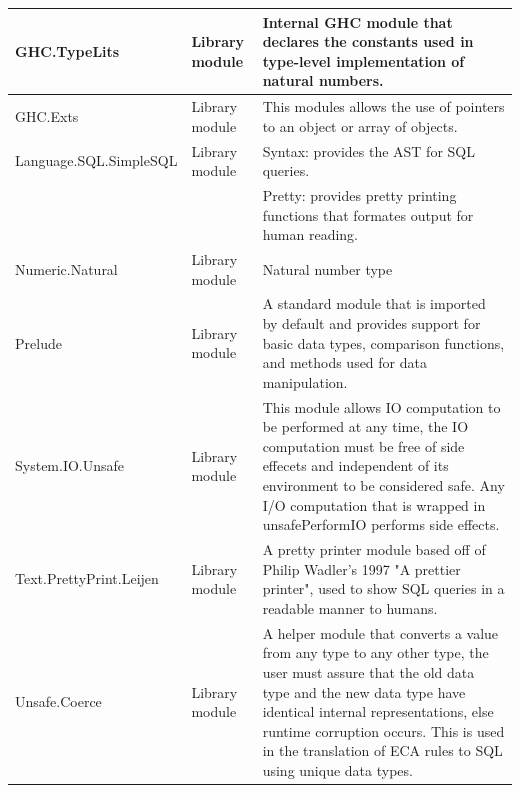 \documentclass[12pt]{report}
\begin{document}
\begin{longtable}{ |m{4.5cm}|m{1.5cm}|m{7cm}|  }
    \hline
    GHC.TypeLits & Library module & Internal GHC module that declares the 
    constants used in type-level implementation of natural numbers.  \\ 
    \hline    
    GHC.Exts & Library module & This modules allows the use of pointers to an 
    object or array of objects.  \\ \hline    
    Language.SQL.SimpleSQL & Library module & Syntax: provides the AST for SQL 
    queries. \\& & Pretty: provides pretty printing functions that formates 
    output for human reading. \\ \hline            
    Numeric.Natural & Library module & Natural number type  \\ \hline    
    Prelude & Library module & A standard module that is imported by default 
    and provides support for basic data types, comparison functions, and 
    methods used for data manipulation.   \\ \hline
    System.IO.Unsafe & Library module & This module allows IO computation to be 
    performed at any time, the IO computation must be free of side effecets and 
    independent of its environment to be considered safe. Any I/O computation 
    that is wrapped in unsafePerformIO performs side effects.  \\ \hline
    Text.PrettyPrint.Leijen & Library module & A pretty printer module based 
    off of Philip Wadler's 1997 "A prettier printer", used to show SQL queries 
    in a readable manner to humans.  \\ \hline        
    Unsafe.Coerce & Library module & A helper module that converts a value from 
    any type to any other type, the user must assure that the old data type and 
    the new data type have identical internal representations, else runtime 
    corruption occurs. This is used in the translation of ECA rules to SQL 
    using unique data types.  \\ 
    \hline  
\end{longtable}
\end{document}
